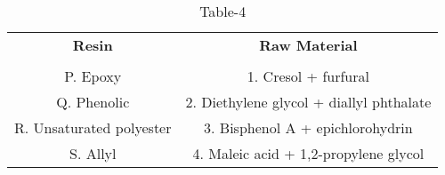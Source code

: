 \begin{table}[htbp]
  \centering
  \caption{Table-4}
  \label{tab:tables/table4.tex}
  \begin{tabular}{cc}
  \textbf{Resin} & \textbf{Raw Material} \\ \\
    P. Epoxy & 1. Cresol + furfural \\
    Q. Phenolic & 2. Diethylene glycol + diallyl phthalate \\
    R. Unsaturated polyester & 3. Bisphenol A + epichlorohydrin \\
    S. Allyl & 4. Maleic acid + 1,2-propylene glycol \\
  \end{tabular}
\end{table}